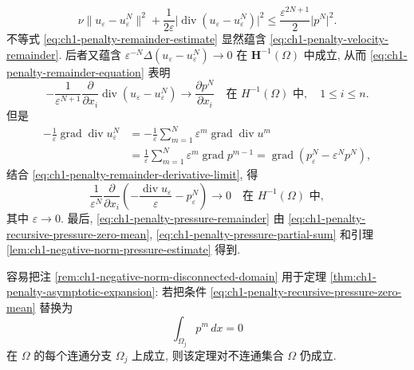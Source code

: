 \begin{Proof}
\begin{equation}
\nu\lVert u_\varepsilon-u_\varepsilon^N\rVert^2
+\frac{1}{2\varepsilon}
\lvert\operatorname{div}(u_\varepsilon-u_\varepsilon^N)\rvert^2
\leq\frac{\varepsilon^{2N+1}}{2}\lvert p^N\rvert^2.
\label{eq:ch1-penalty-remainder-estimate}
\end{equation}
不等式 \eqref{eq:ch1-penalty-remainder-estimate} 显然蕴含 \eqref{eq:ch1-penalty-velocity-remainder}. 后者又蕴含 $\varepsilon^{-N}\Delta(u_\varepsilon-u_\varepsilon^N)\to0$ 在 $\mathbf H^{-1}(\Omega)$ 中成立, 从而 \eqref{eq:ch1-penalty-remainder-equation} 表明
\begin{equation}
-\frac{1}{\varepsilon^{N+1}}
\frac{\partial}{\partial x_i}
\operatorname{div}(u_\varepsilon-u_\varepsilon^N)
\longrightarrow\frac{\partial p^N}{\partial x_i}
\quad\text{在 }H^{-1}(\Omega)\text{ 中},
\quad1\leq i\leq n.
\label{eq:ch1-penalty-remainder-derivative-limit}
\end{equation}
但是
\[
\begin{aligned}
-\frac{1}{\varepsilon}\operatorname{grad}\operatorname{div}u_\varepsilon^N
&=-\frac{1}{\varepsilon}\sum_{m=1}^{N}\varepsilon^m
\operatorname{grad}\operatorname{div}u^m\\
&=\frac{1}{\varepsilon}\sum_{m=1}^{N}\varepsilon^m
\operatorname{grad}p^{m-1}
=\operatorname{grad}(p_\varepsilon^N-\varepsilon^Np^N),
\end{aligned}
\]
结合 \eqref{eq:ch1-penalty-remainder-derivative-limit}, 得
\[
\frac{1}{\varepsilon^N}\frac{\partial}{\partial x_i}
\left(-\frac{\operatorname{div}u_\varepsilon}{\varepsilon}
-p_\varepsilon^N\right)
\longrightarrow0
\quad\text{在 }H^{-1}(\Omega)\text{ 中},
\]
其中 $\varepsilon\to0$. 最后, \eqref{eq:ch1-penalty-pressure-remainder} 由 \eqref{eq:ch1-penalty-recursive-pressure-zero-mean}, \eqref{eq:ch1-penalty-pressure-partial-sum} 和引理 \ref{lem:ch1-negative-norm-pressure-estimate} 得到.
\end{Proof}

\begin{Remark}
\label{rem:ch1-penalty-asymptotic-disconnected-domain}
容易把注 \ref{rem:ch1-negative-norm-disconnected-domain} 用于定理 \ref{thm:ch1-penalty-asymptotic-expansion}: 若把条件 \eqref{eq:ch1-penalty-recursive-pressure-zero-mean} 替换为
\begin{equation}
\int_{\Omega_j}p^m\,dx=0
\label{eq:ch1-penalty-recursive-component-zero-mean}
\end{equation}
在 $\Omega$ 的每个连通分支 $\Omega_j$ 上成立, 则该定理对不连通集合 $\Omega$ 仍成立.
\end{Remark}

